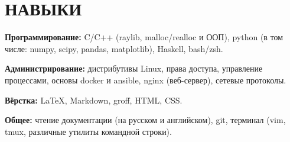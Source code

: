 \section{НАВЫКИ}

\begin{description}

    \setlength\itemsep{-0.4em}

    \item{\bfseries Программирование:}
    C/C++ (raylib, malloc/realloc и ООП), python (в том числе: numpy, scipy, pandas, matplotlib), Haskell, bash/zsh.

    \item{\bfseries Администрирование:}
    дистрибутивы Linux, права доступа, управление процессами, основы docker и ansible, nginx (веб-сервер),
    сетевые протоколы.
    
    \item{\bfseries Вёрстка:}
    \LaTeX, Markdown, groff, HTML, CSS.

    \item{\bfseries Общее:}
    чтение документации (на русском и английском), git, терминал (vim, tmux, различные утилиты командной строки).

\end{description}
    
    \vspace{.7em}
